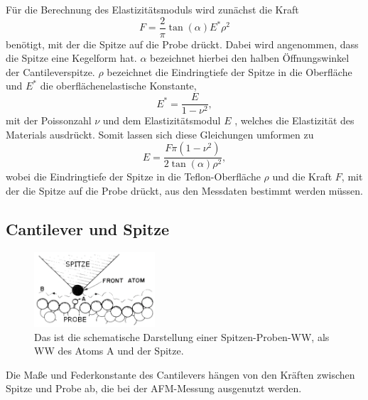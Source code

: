     \FloatBarrier
    Für die Berechnung des Elastizitätsmoduls wird zunächst die Kraft
    \begin{equation}
        F=\frac{2}{\pi}\tan(\alpha)E^*\rho^2
    \end{equation}
    benötigt, mit der die Spitze auf die Probe drückt.
    Dabei wird angenommen, dass die Spitze eine Kegelform hat.
    $\alpha$ bezeichnet hierbei den halben Öffnungswinkel der Cantileverspitze.
    $\rho$ bezeichnet die Eindringtiefe der Spitze in die Oberfläche und $E^*$ die oberflächenelastische Konstante,
    \begin{equation}
        E^*=\frac{E}{1-\nu^2},
    \end{equation}
    mit der Poissonzahl $\nu$ und dem Elastizitätsmodul $E$ \cite{Elasti}, welches die Elastizität des Materials ausdrückt.
    Somit lassen sich diese Gleichungen umformen zu
    \begin{equation}
        E=\frac{F\pi(1-\nu^2)}{2\tan(\alpha)\rho^2},
    \end{equation}
    wobei die Eindringtiefe der Spitze in die Teflon-Oberfläche $\rho$ und die Kraft $F$, mit der die Spitze auf die Probe drückt, aus den Messdaten bestimmt werden müssen.
    
\subsection{Cantilever und Spitze}
\label{sec:cantilever}
    \setlength{\columnsep}{25pt}
    \begin{figure} \vspace*{-0.5cm}
        \centering{}
        \includegraphics[width=0.4\textwidth]{bilder/Federkraftkonstante.png}
        \caption{Das ist die schematische Darstellung einer Spitzen-Proben-WW, als WW des Atoms A und der Spitze. \cite{atomic_force_microscope}} \vspace*{-0.3cm}
        \label{fig:Federkraftkonstante}
    \end{figure} 
    \FloatBarrier
    Die Maße und Federkonstante des Cantilevers hängen von den Kräften zwischen Spitze und Probe ab, die bei der AFM-Messung ausgenutzt werden.
    
